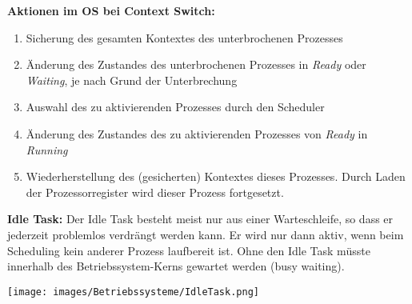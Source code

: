 \textbf{Aktionen im OS bei Context Switch:}
\begin{enumerate}
    \item Sicherung des gesamten Kontextes des unterbrochenen Prozesses
    \item Änderung des Zustandes des unterbrochenen Prozesses in \textit{Ready} oder \textit{Waiting}, je nach Grund der Unterbrechung
    \item Auswahl des zu aktivierenden Prozesses durch den Scheduler
    \item Änderung des Zustandes des zu aktivierenden Prozesses von \textit{Ready} in \textit{Running}
    \item Wiederherstellung des (gesicherten) Kontextes dieses Prozesses. Durch Laden der Prozessorregister wird dieser Prozess fortgesetzt.
\end{enumerate}
\begin{minipage}{0.7\linewidth}
\textbf{Idle Task:} Der Idle Task besteht meist nur aus einer Warteschleife, so dass er jederzeit
problemlos verdrängt werden kann. Er wird nur dann aktiv, wenn beim Scheduling kein anderer Prozess laufbereit ist. Ohne den Idle Task müsste innerhalb des Betriebssystem-Kerns gewartet werden
(busy waiting).
\end{minipage}
\begin{minipage}{0.3\linewidth}
\texttt{[image: images/Betriebssysteme/IdleTask.png]}
\end{minipage}
